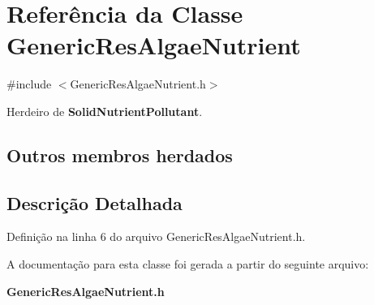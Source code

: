 \section{Referência da Classe Generic\+Res\+Algae\+Nutrient}
\label{class_generic_res_algae_nutrient}


{\ttfamily \#include $<$Generic\+Res\+Algae\+Nutrient.\+h$>$}



Herdeiro de {\bf Solid\+Nutrient\+Pollutant}.

\subsection*{Outros membros herdados}


\subsection{Descrição Detalhada}


Definição na linha 6 do arquivo Generic\+Res\+Algae\+Nutrient.\+h.



A documentação para esta classe foi gerada a partir do seguinte arquivo\+:\begin{DoxyCompactItemize}
\item 
{\bf Generic\+Res\+Algae\+Nutrient.\+h}\end{DoxyCompactItemize}
